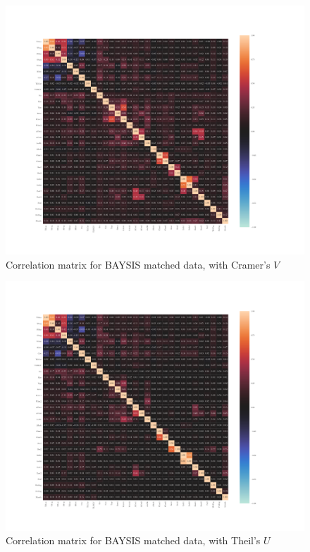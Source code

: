 \documentclass[a4paper,headsepline,footsepline,fontsize=11pt,BCOR=12mm,DIV=12]{report}
\begin{document}
\begin{appendices}
\begin{figure}[h]
	\centering
	\includegraphics[scale=0.52, trim=2cm 2cm 0cm 0cm]{../CorrAnalysis/data/BAYSIS/02_matched/plots/baysis_matched_corr_cramers}
	\caption{Correlation matrix for BAYSIS matched data, with Cramer's $V$}
	\label{img:appendix_correlation_matrix_matched_cramers}
\end{figure}

\label{appendix_baysis_dataset_corr_theils}
\begin{figure}[h]
	\centering
	\includegraphics[scale=0.52, trim=2cm 2cm 0cm 0cm]{../CorrAnalysis/data/BAYSIS/02_matched/plots/baysis_matched_corr_theils}
	\caption{Correlation matrix for BAYSIS matched data, with Theil's $U$}
	\label{img:appendix_correlation_matrix_matched_theils}
\end{figure}
\restoregeometry


\end{appendices}
\end{document}
